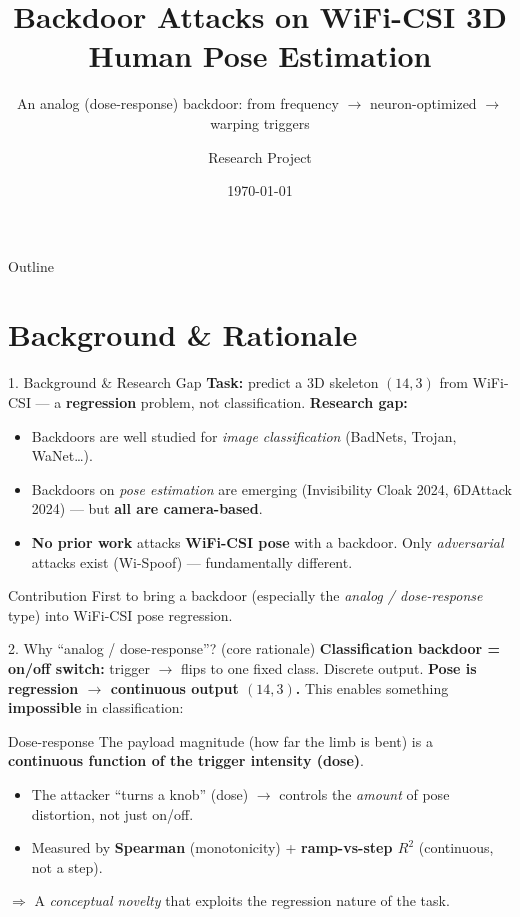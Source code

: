 \documentclass[aspectratio=169,10pt]{beamer}
\title[Backdoor on WiFi-CSI Pose]{Backdoor Attacks on WiFi-CSI 3D Human Pose Estimation}
\subtitle{An analog (dose-response) backdoor: from frequency $\to$ neuron-optimized $\to$ warping triggers}
\author{Research Project}
\institute{Victim: HPELiNet \quad$\cdot$\quad Dataset: Person-in-WiFi-3D (89{,}946 train / 7{,}824 test)}
\date{\today}
\newcommand{\bad}[1]{\textcolor{bad}{\textbf{#1}}}
\newcommand{\acc}[1]{\textcolor{accent}{\textbf{#1}}}
\begin{document}
\begin{frame}[plain]
  \titlepage
\end{frame}

\begin{frame}{Outline}
  \tableofcontents
\end{frame}

\section{Background \& Rationale}

\begin{frame}{1. Background \& Research Gap}
  \textbf{Task:} predict a 3D skeleton $(14,3)$ from WiFi-CSI --- a \acc{regression} problem, not classification.
  \vfill
  \textbf{Research gap:}
  \begin{itemize}
    \item Backdoors are well studied for \emph{image classification} (BadNets, Trojan, WaNet\ldots).
    \item Backdoors on \emph{pose estimation} are emerging (Invisibility Cloak 2024, 6DAttack 2024) --- but \bad{all are camera-based}.
    \item \bad{No prior work} attacks \textbf{WiFi-CSI pose} with a backdoor. Only \emph{adversarial} attacks exist (Wi-Spoof) --- fundamentally different.
  \end{itemize}
  \vfill
  \begin{block}{Contribution}
    First to bring a backdoor (especially the \emph{analog / dose-response} type) into WiFi-CSI pose regression.
  \end{block}
\end{frame}

\begin{frame}{2. Why ``analog / dose-response''? (core rationale)}
  \textbf{Classification backdoor = on/off switch:} trigger $\to$ flips to one fixed class. Discrete output.
  \vfill
  \textbf{Pose is regression $\to$ continuous output $(14,3)$.} This enables something \bad{impossible} in classification:
  \begin{block}{Dose-response}
    The payload magnitude (how far the limb is bent) is a \acc{continuous function of the trigger intensity (dose)}.
  \end{block}
  \begin{itemize}
    \item The attacker ``turns a knob'' (dose) $\to$ controls the \emph{amount} of pose distortion, not just on/off.
    \item Measured by \textbf{Spearman} (monotonicity) + \textbf{ramp-vs-step $R^2$} (continuous, not a step).
  \end{itemize}
  \vfill
  $\Rightarrow$ A \emph{conceptual novelty} that exploits the regression nature of the task.
\end{frame}
\end{document}
